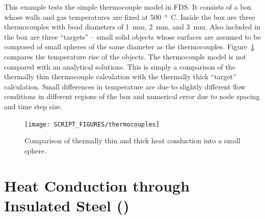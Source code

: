 \documentclass[11pt]{book}
\begin{document}
This example tests the simple thermocouple model in FDS. It consists of a box whose walls and gas temperatures are fixed at 500~\si{\degree C}. Inside the box are three thermocouples with bead diameters of 1~mm, 2~mm, and 3~mm. Also included in the box are three ``targets'' -- small solid objects whose surfaces are assumed to be composed of small spheres of the same diameter as the thermocouples. Figure~\ref{thermocouples_fig} compares the temperature rise of the objects. The thermocouple model is not compared with an analytical solutions. This is simply a comparison of the thermally thin thermocouple calculation with the thermally thick ``target'' calculation. Small differences in temperature are due to slightly different flow conditions in different regions of the box and numerical error due to node spacing and time step size.

\begin{figure}[ht]
\centering
\texttt{[image: SCRIPT\_FIGURES/thermocouples]}
\caption[The  test case]{Comparison of thermally thin and thick heat conduction into a small sphere.}
\label{thermocouples_fig}
\end{figure}


\clearpage

\section{Heat Conduction through Insulated Steel (\texorpdfstring{}{insulated\_steel\_x})}
\label{insulated_steel_pipe}
\label{insulated_steel_plate}
\end{document}
